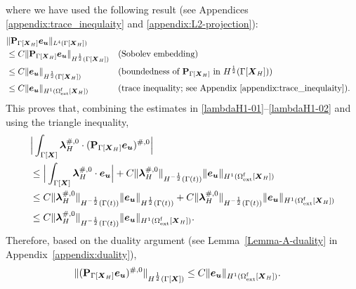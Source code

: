 \documentclass[11pt,reqno]{amsart}
\theoremstyle{definition}
\theoremstyle{plain}
\numberwithin{theorem}{section}
\numberwithin{proposition}{section}
\numberwithin{lemma}{section}
\numberwithin{equation}{section}
\newcommand{\bs}[1]{\boldsymbol{#1}}
\renewcommand{\(}{\bigl(}
\renewcommand{\)}{\bigr)}
\begin{document}
where we have used the following result (see Appendices \ref{appendix:trace_inequlaity} and \ref{appendix:L2-projection}):
\begin{align*}
&\|{\bf P}_{\Gamma[\bs X_H]}{\bs e}_{\bs u}\|_{L^4(\Gamma[{\bs X}_H])} \notag\\
&\le C\|{\bf P}_{\Gamma[\bs X_H]}{\bs e}_{\bs u}\|_{H^{\frac12}(\Gamma[{\bs X}_H])} &&\mbox{(Sobolev embedding)}\notag\\
&\le C\|{\bs e}_{\bs u}\|_{H^{\frac12}(\Gamma[{\bs X}_H])} &&\mbox{(boundedness of ${\bf P}_{\Gamma[\bs X_H]}$ in $H^{\frac12}(\Gamma[{\bs X}_H])$)}\notag\\
&\le C\|{\bs e}_{\bs u}\|_{H^1(\Omega^{\rm f}_{\rm ext}[{\bs X}_H])} &&\mbox{(trace inequality; see Appendix \ref{appendix:trace_inequlaity})}. 
\end{align*}
This proves that, combining the estimates in \eqref{lambdaH1-01}--\eqref{lambdaH1-02} and using the triangle inequality, 
\begin{align}
&\Big|\int_{\Gamma[\bs X]} {\bs\lambda}_H^{\#,0} \cdot ({\bf P}_{\Gamma[\bs X_H]}{\bs e}_{\bs u})^{\#,0}\Big| \notag\\
&\le \Big|\int_{\Gamma[\bs X]} \bs \lambda_H^{\#,0} \cdot {\bs e}_{\bs u} \Big| 
+ C\|{\bs \lambda}_H^{\#,0}\|_{H^{-\frac12}(\Gamma(t))} \| {\bs e}_{\bs u}\|_{H^1(\Omega^{\rm f}_{\rm ext}[\bs  X_H])} \notag \\
&\le 
C\|{\bs \lambda}_H^{\#,0}\|_{H^{-\frac12}(\Gamma(t))} \|{\bs e}_{\bs u}\|_{H^{\frac12}(\Gamma(t))} 
+ C\|{\bs \lambda}_H^{\#,0}\|_{H^{-\frac12}(\Gamma(t))} \| {\bs e}_{\bs u}\|_{H^1(\Omega^{\rm f}_{\rm ext}[\bs  X_H])} \notag\\
&\le 
C\|{\bs \lambda}_H^{\#,0}\|_{H^{-\frac12}(\Gamma(t))} \| {\bs e}_{\bs u}\|_{H^1(\Omega^{\rm f}_{\rm ext}[\bs  X_H])} .
\end{align} 
Therefore, based on the duality argument (see Lemma~\ref{Lemma-A-duality} in Appendix~\ref{appendix:duality}), 
\begin{align}\label{H12-PXeu}
\| ({\bf P}_{\Gamma[\bs X_H]}{\bs e}_{\bs u})^{\#,0}\|_{H^{\frac12}(\Gamma[\bs X])} 
&\le C\| {\bs e}_{\bs u}\|_{H^1(\Omega^{\rm f}_{\rm ext}[\bs  X_H])} . 
\end{align} 
\end{document}
